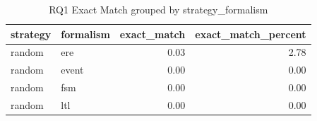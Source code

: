 \begin{table}
\caption{RQ1 Exact Match grouped by strategy_formalism}
\label{tab:rq1_strategy_formalism}
\begin{tabular}{llrr}
\toprule
strategy & formalism & exact_match & exact_match_percent \\
\midrule
random & ere & 0.03 & 2.78 \\
random & event & 0.00 & 0.00 \\
random & fsm & 0.00 & 0.00 \\
random & ltl & 0.00 & 0.00 \\
\bottomrule
\end{tabular}
\end{table}
